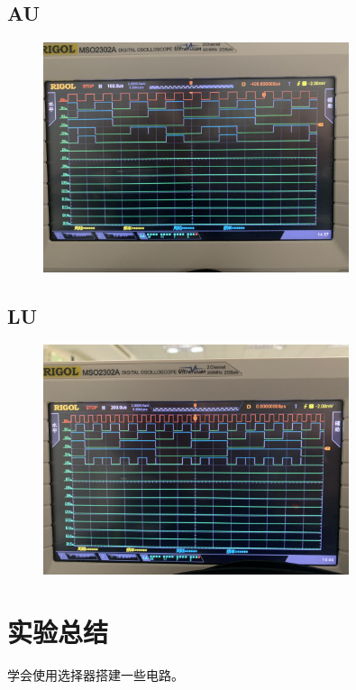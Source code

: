 \documentclass[UTF8, a4paper, 11pt]{article}
\begin{document}
\subsection{AU}
\begin{figure}[H]
    \centering
    \includegraphics[width=0.8\textwidth]{AU.png}
\end{figure}
\subsection{LU}
\begin{figure}[H]
    \centering
    \includegraphics[width=0.8\textwidth]{LU.png}
\end{figure}
\section{实验总结}
学会使用选择器搭建一些电路。
%
%
\end{document}

